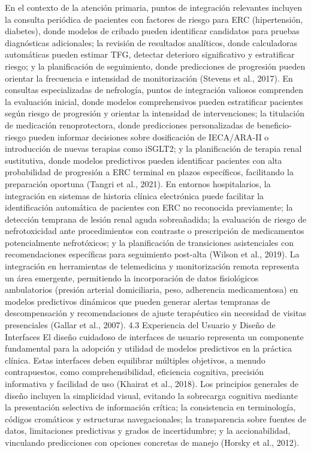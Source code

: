 \documentclass{article}
\begin{document}
\begin{multicols}{2}
En el contexto de la atención primaria, puntos de integración relevantes incluyen la consulta periódica de pacientes con factores de riesgo para ERC (hipertensión, diabetes), donde modelos de cribado pueden identificar candidatos para pruebas diagnósticas adicionales; la revisión de resultados analíticos, donde calculadoras automáticas pueden estimar TFG, detectar deterioro significativo y estratificar riesgo; y la planificación de seguimiento, donde predicciones de progresión pueden orientar la frecuencia e intensidad de monitorización (Stevens et al., 2017).
En consultas especializadas de nefrología, puntos de integración valiosos comprenden la evaluación inicial, donde modelos comprehensivos pueden estratificar pacientes según riesgo de progresión y orientar la intensidad de intervenciones; la titulación de medicación renoprotectora, donde predicciones personalizadas de beneficio-riesgo pueden informar decisiones sobre dosificación de IECA/ARA-II o introducción de nuevas terapias como iSGLT2; y la planificación de terapia renal sustitutiva, donde modelos predictivos pueden identificar pacientes con alta probabilidad de progresión a ERC terminal en plazos específicos, facilitando la preparación oportuna (Tangri et al., 2021).
En entornos hospitalarios, la integración en sistemas de historia clínica electrónica puede facilitar la identificación automática de pacientes con ERC no reconocida previamente; la detección temprana de lesión renal aguda sobreañadida; la evaluación de riesgo de nefrotoxicidad ante procedimientos con contraste o prescripción de medicamentos potencialmente nefrotóxicos; y la planificación de transiciones asistenciales con recomendaciones específicas para seguimiento post-alta (Wilson et al., 2019).
La integración en herramientas de telemedicina y monitorización remota representa un área emergente, permitiendo la incorporación de datos fisiológicos ambulatorios (presión arterial domiciliaria, peso, adherencia medicamentosa) en modelos predictivos dinámicos que pueden generar alertas tempranas de descompensación y recomendaciones de ajuste terapéutico sin necesidad de visitas presenciales (Gallar et al., 2007).
 4.3 Experiencia del Usuario y Diseño de Interfaces
El diseño cuidadoso de interfaces de usuario representa un componente fundamental para la adopción y utilidad de modelos predictivos en la práctica clínica. Estas interfaces deben equilibrar múltiples objetivos, a menudo contrapuestos, como comprehensibilidad, eficiencia cognitiva, precisión informativa y facilidad de uso (Khairat et al., 2018).
Los principios generales de diseño incluyen la simplicidad visual, evitando la sobrecarga cognitiva mediante la presentación selectiva de información crítica; la consistencia en terminología, códigos cromáticos y estructuras navegacionales; la transparencia sobre fuentes de datos, limitaciones predictivas y grados de incertidumbre; y la accionabilidad, vinculando predicciones con opciones concretas de manejo (Horsky et al., 2012).

\end{multicols}
\end{document}
